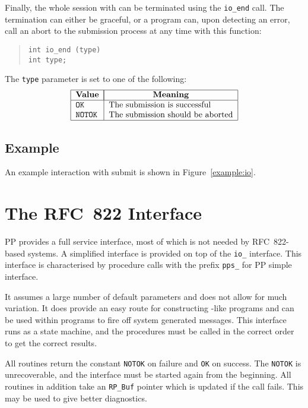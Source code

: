 Finally, the whole session with  can be terminated using
the \verb|io_end| call. The termination can either be graceful, or a
program can, upon detecting an error, call an abort to the submission
process at any time with this function:
\begin{quote}\begin{verbatim}
int io_end (type)
int type;
\end{verbatim}\end{quote}
The \verb|type| parameter is set to one of the following:
\[\begin{tabular}{|l|l|}
\hline
	\multicolumn{1}{|c|}{\bf Value}&
		\multicolumn{1}{|c|}{\bf Meaning}\\
\hline
	\tt OK&		The submission is successful\\
	\tt NOTOK&	The submission should be aborted\\
\hline
\end{tabular}\]


\subsection {Example}

An example interaction with submit is shown in Figure~\ref{example:io}.


\section {The RFC~822 Interface}

PP provides a full service interface, most of which is not needed by
RFC~822-based systems.  A simplified interface is provided on top of
the \verb|io_| interface.  This interface is characterised by procedure
calls with the prefix \verb|pps_| for PP simple interface. 

It assumes a large number of default parameters and does not allow for
much variation.  It does provide an easy route for constructing
-like programs and can be used within programs to fire off
system generated messages.  This interface runs as a state machine,
and the procedures must be called in the correct order to get the
correct results.

All routines return the constant \verb|NOTOK| on failure and \verb|OK|
on success.  The \verb|NOTOK| is unrecoverable, and the interface must
be started again from the beginning. All routines in addition take an
\verb|RP_Buf| pointer which is updated if the call fails. This may be
used to give better diagnostics.

